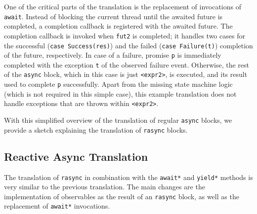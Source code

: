 \documentclass{acm_proc_article-sp}
\begin{document}
One of the critical parts of the translation is the replacement of invocations
of \verb|await|. Instead of blocking the current thread until the awaited
future is completed, a completion callback is registered with the awaited
future. The completion callback is invoked when \verb|fut2| is completed; it
handles two cases for the successful (\verb|case Success(res)|) and the failed
(\verb|case Failure(t)|) completion of the future, respectively. In case of a
failure, promise \verb|p| is immediately completed with the exception \verb|t|
of the observed failure event. Otherwise, the rest of the \verb|async| block,
which in this case is just \verb|<expr2>|, is executed, and its result used to
complete \verb|p| successfully. Apart from the missing state machine logic
(which is not required in this simple case), this example translation does not
handle exceptions that are thrown within \verb|<expr2>|.

With this simplified overview of the translation of regular \verb|async|
blocks, we provide a sketch explaining the translation of \verb|rasync|
blocks.

\subsection{Reactive Async Translation}\label{sec:rasync-translation}

The translation of \verb|rasync| in combination with the \verb|await*| and
\verb|yield*| methods is very similar to the previous translation. The main
changes are the implementation of observables as the result of an
\verb|rasync| block, as well as the replacement of \verb|await*| invocations.
\end{document}
